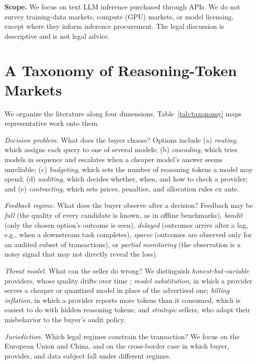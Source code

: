 \textbf{Scope.} We focus on text LLM inference purchased through APIs. We do not survey training-data markets, compute (GPU) markets, or model licensing, except where they inform inference procurement. The legal discussion is descriptive and is not legal advice.

\section{A Taxonomy of Reasoning-Token Markets}\label{a-taxonomy-of-reasoning-token-markets}

We organize the literature along four dimensions. Table~\ref{tab:taxonomy} maps representative work onto them.

\emph{Decision problem.} What does the buyer choose? Options include (a) \emph{routing}, which assigns each query to one of several models; (b) \emph{cascading}, which tries models in sequence and escalates when a cheaper model's answer seems unreliable; (c) \emph{budgeting}, which sets the number of reasoning tokens a model may spend; (d) \emph{auditing}, which decides whether, when, and how to check a provider; and (e) \emph{contracting}, which sets prices, penalties, and allocation rules ex ante.

\emph{Feedback regime.} What does the buyer observe after a decision? Feedback may be \emph{full} (the quality of every candidate is known, as in offline benchmarks), \emph{bandit} (only the chosen option's outcome is seen), \emph{delayed} (outcomes arrive after a lag, e.g., when a downstream task completes), \emph{sparse} (outcomes are observed only for an audited subset of transactions), or \emph{partial monitoring} (the observation is a noisy signal that may not directly reveal the loss).

\emph{Threat model.} What can the seller do wrong? We distinguish \emph{honest-but-variable} providers, whose quality drifts over time \cite{chen2024drift}; \emph{model substitution}, in which a provider serves a cheaper or quantized model in place of the advertised one; \emph{billing inflation}, in which a provider reports more tokens than it consumed, which is easiest to do with hidden reasoning tokens; and \emph{strategic} sellers, who adapt their misbehavior to the buyer's audit policy.

\emph{Jurisdiction.} Which legal regimes constrain the transaction? We focus on the European Union and China, and on the cross-border case in which buyer, provider, and data subject fall under different regimes.


